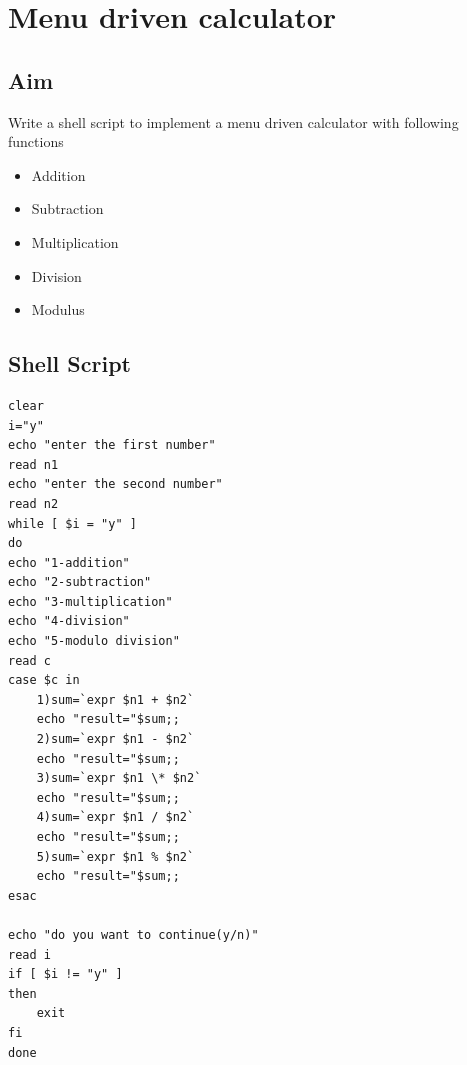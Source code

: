 \documentclass{article}
\begin{document}
\begin{refsection}
\cite{shellbible}
\cite{shellbook}
\printbibliography
\end{refsection}

\newpage

\section{Menu driven calculator}
\subsection{Aim}
Write a shell script to implement a menu driven calculator with following functions
\begin{itemize}

\item Addition
\item Subtraction
\item Multiplication
\item Division
\item Modulus

\end{itemize}

\subsection{Shell Script}

\begin{verbatim}
clear 
i="y"
echo "enter the first number"
read n1
echo "enter the second number"
read n2
while [ $i = "y" ]
do
echo "1-addition"
echo "2-subtraction"
echo "3-multiplication"
echo "4-division"
echo "5-modulo division"
read c
case $c in 
	1)sum=`expr $n1 + $n2`
	echo "result="$sum;;
	2)sum=`expr $n1 - $n2`
    echo "result="$sum;;
	3)sum=`expr $n1 \* $n2`
    echo "result="$sum;;
	4)sum=`expr $n1 / $n2`
    echo "result="$sum;;
    5)sum=`expr $n1 % $n2`
    echo "result="$sum;;
esac

echo "do you want to continue(y/n)"
read i
if [ $i != "y" ]
then 
	exit
fi
done
\end{verbatim}
\end{document}
